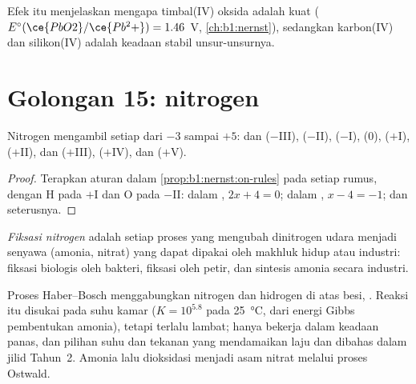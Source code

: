 Efek itu menjelaskan mengapa timbal(IV) oksida adalah  kuat
($E^\circ(\ce{PbO2}/\ce{Pb^2+}) = 1.46$~V, \cref{ch:b1:nernst}), sedangkan
karbon(IV) dan silikon(IV) adalah keadaan stabil unsur-unsurnya.

\section{Golongan 15: nitrogen}

\begin{proposition}\label{prop:b1:p-block-13-15:nitrogen-ladder}
Nitrogen mengambil setiap  dari $-3$ sampai $+5$:  dan
 ($-$III),  ($-$II),  ($-$I),  (0),
 ($+$I),  ($+$II),  dan  ($+$III),
 ($+$IV),  dan  ($+$V).
\end{proposition}

\begin{proof}
Terapkan aturan dalam \cref{prop:b1:nernst:on-rules} pada setiap rumus,
dengan H pada $+$I dan O pada $-$II: dalam , $2x + 4 = 0$; dalam , $x - 4 =
-1$; dan seterusnya.
\end{proof}

\begin{definition}\label{def:b1:p-block-13-15:nitrogen-fixation}
\emph{Fiksasi nitrogen} adalah setiap proses yang
mengubah dinitrogen udara menjadi senyawa (amonia, nitrat) yang dapat
dipakai oleh makhluk hidup atau industri: fiksasi biologis oleh bakteri,
fiksasi oleh petir, dan sintesis amonia secara industri.
\end{definition}

Proses Haber--Bosch menggabungkan nitrogen dan hidrogen di atas 
besi, . Reaksi itu disukai pada suhu kamar
($K = 10^{5.8}$ pada \qty{25}{\celsius}, dari energi Gibbs pembentukan
amonia), tetapi terlalu lambat;  hanya bekerja dalam keadaan
panas, dan pilihan suhu dan tekanan yang mendamaikan laju dan 
dibahas dalam jilid Tahun~2. Amonia lalu dioksidasi menjadi asam nitrat
melalui proses Ostwald.

